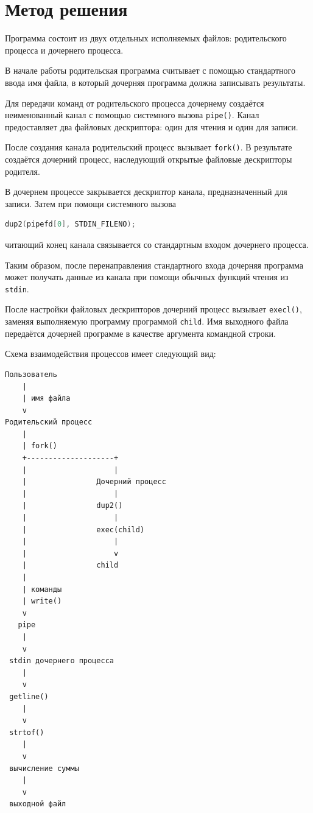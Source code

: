\section{Метод решения}

Программа состоит из двух отдельных исполняемых файлов: родительского
процесса и дочернего процесса.

В начале работы родительская программа считывает с помощью стандартного
ввода имя файла, в который дочерняя программа должна записывать результаты.

Для передачи команд от родительского процесса дочернему создаётся
неименованный канал с помощью системного вызова \texttt{pipe()}.
Канал предоставляет два файловых дескриптора: один для чтения и один
для записи.

После создания канала родительский процесс вызывает \texttt{fork()}.
В результате создаётся дочерний процесс, наследующий открытые файловые
дескрипторы родителя.

В дочернем процессе закрывается дескриптор канала, предназначенный для
записи. Затем при помощи системного вызова

\begin{lstlisting}[language=C]
dup2(pipefd[0], STDIN_FILENO);
\end{lstlisting}

читающий конец канала связывается со стандартным входом дочернего
процесса.

Таким образом, после перенаправления стандартного входа дочерняя программа
может получать данные из канала при помощи обычных функций чтения из
\texttt{stdin}.

После настройки файловых дескрипторов дочерний процесс вызывает
\texttt{execl()}, заменяя выполняемую программу программой
\texttt{child}. Имя выходного файла передаётся дочерней программе в
качестве аргумента командной строки.

Схема взаимодействия процессов имеет следующий вид:

\begin{verbatim}
Пользователь
    |
    | имя файла
    v
Родительский процесс
    |
    | fork()
    +--------------------+
    |                    |
    |                Дочерний процесс
    |                    |
    |                dup2()
    |                    |
    |                exec(child)
    |                    |
    |                    v
    |                child
    |
    | команды
    | write()
    v
   pipe
    |
    v
 stdin дочернего процесса
    |
    v
 getline()
    |
    v
 strtof()
    |
    v
 вычисление суммы
    |
    v
 выходной файл
\end{verbatim}

